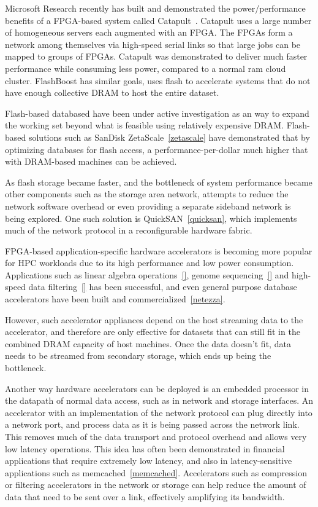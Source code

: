 Microsoft Research recently has built and demonstrated the power/performance
benefits of a FPGA-based system called Catapult~\cite{msr_catapult}.
Catapult uses a large number of homogeneous servers each augmented with an FPGA.
The FPGAs form a network among themselves via high-speed serial links so that
large jobs can be mapped to groups of FPGAs. Catapult was demonstrated to
deliver much faster performance while consuming less power, compared to a normal
ram cloud cluster. FlashBoost has similar goals, uses flash to accelerate
systems that do not have enough collective DRAM to host the entire dataset.

Flash-based databased have been under active investigation as an way to expand
the working set beyond what is feasible using relatively expensive DRAM.
Flash-based solutions such as SanDisk ZetaScale~\ref{zetascale} have
demonstrated that by optimizing databases for flash access, a
performance-per-dollar much higher that with DRAM-based machines can be
achieved.

As flash storage became faster, and the bottleneck of system performance became
other components such as the storage area network, attempts to reduce the
network software overhead or even providing a separate sideband network is being
explored. One such solution is QuickSAN~\ref{quicksan}, which implements much of
the network protocol in a reconfigurable hardware fabric.

FPGA-based application-specific hardware accelerators is becoming more popular
for HPC workloads due to its high performance and low power consumption.
Applications such as linear algebra operations~\ref{}, genome sequencing~\ref{}
and high-speed data filtering~\ref{} has been successful, and even general
purpose database accelerators have been built and commercialized~\ref{netezza}.


However, such accelerator appliances depend on the host streaming data to the
accelerator, and therefore are only effective for datasets that can
still fit in the combined DRAM capacity of host machines. Once the data doesn't
fit, data needs to be streamed from secondary storage, which ends up being the
bottleneck.

Another way hardware accelerators can be deployed is an embedded processor in
the datapath of normal data access, such as in network and storage interfaces. 
An accelerator with an implementation of the
network protocol can plug directly into a network
port, and process data as it is being passed across the network link. This
removes much of the data transport and protocol overhead and allows very low
latency operations. This idea has often been demonstrated in financial
applications that require extremely low latency, and also in latency-sensitive
applications such as memcached~\ref{memcached}. Accelerators such as compression
or filtering accelerators in the network or storage can help reduce the amount
of data that need to be sent over a link, effectively amplifying its bandwidth.


